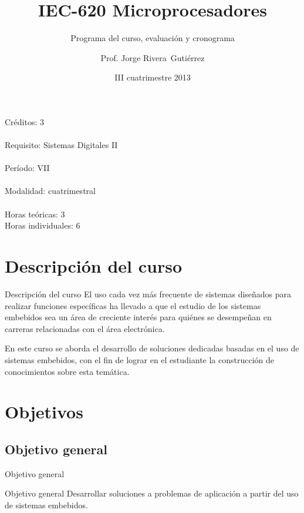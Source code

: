 \documentclass[handout,xcolor=dvipsnames]{beamer}
\title[IEC-620]{IEC-620 Microprocesadores}
\subtitle{Programa del curso, evaluación y cronograma}
\author{Prof. Jorge Rivera~Guti\'errez}
\institute{Universidad Latina de Costa Rica\\ Ingenier\'\i a en Electr\'onica}
\date{III cuatrimestre 2013}
\newcommand{\pageframe}[1]{\frame{\begin{center}{ \Huge #1 }\end{center}}}
\begin{document}
\begin{frame}
 \maketitle
\end{frame}

\begin{frame}
 \begin{center}
  \Large Créditos: 3\\~\\
  Requisito: Sistemas Digitales II\\~\\
  Período: VII\\~\\
  Modalidad: cuatrimestral\\~\\
  Horas te\'oricas: 3\\
  Horas individuales: 6
 \end{center}
\end{frame}

\section{Descripción del curso}

\begin{frame}{Descripción del curso}
 El uso cada vez más frecuente de sistemas diseñados para realizar funciones específicas ha llevado a que el estudio de los sistemas embebidos sea un área de creciente interés para quiénes se desempeñan en carreras relacionadas con el área electrónica.

En este curso se aborda el desarrollo de soluciones dedicadas basadas en el uso de sistemas embebidos, con el fin de lograr en el estudiante la construcción de conocimientos sobre esta temática.
\end{frame}

\section{Objetivos}

\pageframe{Objetivos}

\subsection{Objetivo general}

\begin{frame}{Objetivo general}
  \begin{block}{Objetivo general}
  Desarrollar soluciones a problemas de aplicación a partir del uso de sistemas embebidos.
  \end{block}
\end{frame}
\end{document}
